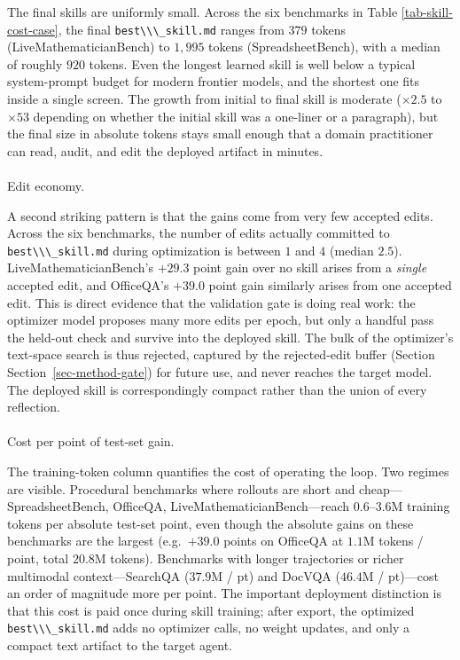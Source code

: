\documentclass[
]{article}
\makeatletter
\let\oldparagraph\paragraph
\renewcommand{\paragraph}{
    \@ifstar
      \xxxParagraphStar
      \xxxParagraphNoStar
  }
\newcommand{\xxxParagraphStar}[1]{\oldparagraph*{#1}\mbox{}}
\newcommand{\xxxParagraphNoStar}[1]{\oldparagraph{#1}\mbox{}}
\newcommand{\passthrough}[1]{#1}
\makeatother
\begin{document}
The final skills are uniformly small. Across the six benchmarks in Table
\ref{tab-skill-cost-case}, the final
\passthrough{\lstinline!best\\\_skill.md!} ranges from \(379\) tokens
(LiveMathematicianBench) to \(1{,}995\) tokens (SpreadsheetBench), with
a median of roughly \(920\) tokens. Even the longest learned skill is
well below a typical system-prompt budget for modern frontier models,
and the shortest one fits inside a single screen. The growth from
initial to final skill is moderate (\(\times 2.5\) to \(\times 53\)
depending on whether the initial skill was a one-liner or a paragraph),
but the final size in absolute tokens stays small enough that a domain
practitioner can read, audit, and edit the deployed artifact in minutes.

\paragraph{Edit economy.}\label{edit-economy.}

A second striking pattern is that the gains come from very few accepted
edits. Across the six benchmarks, the number of edits actually committed
to \passthrough{\lstinline!best\\\_skill.md!} during optimization is
between \(1\) and \(4\) (median \(2.5\)). LiveMathematicianBench's
\(+29.3\) point gain over no skill arises from a \emph{single} accepted
edit, and OfficeQA's \(+39.0\) point gain similarly arises from one
accepted edit. This is direct evidence that the validation gate is doing
real work: the optimizer model proposes many more edits per epoch, but
only a handful pass the held-out check and survive into the deployed
skill. The bulk of the optimizer's text-space search is thus rejected,
captured by the rejected-edit buffer (Section
Section~\ref{sec-method-gate}) for future use, and never reaches the
target model. The deployed skill is correspondingly compact rather than
the union of every reflection.

\paragraph{Cost per point of test-set
gain.}\label{cost-per-point-of-test-set-gain.}

The training-token column quantifies the cost of operating the loop. Two
regimes are visible. Procedural benchmarks where rollouts are short and
cheap---SpreadsheetBench, OfficeQA, LiveMathematicianBench---reach
\(0.6\)--\(3.6\)M training tokens per absolute test-set point, even
though the absolute gains on these benchmarks are the largest
(e.g.~\(+39.0\) points on OfficeQA at \(1.1\)M tokens / point, total
\(20.8\)M tokens). Benchmarks with longer trajectories or richer
multimodal context---SearchQA (\(37.9\)M / pt) and DocVQA (\(46.4\)M /
pt)---cost an order of magnitude more per point. The important
deployment distinction is that this cost is paid once during skill
training; after export, the optimized
\passthrough{\lstinline!best\\\_skill.md!} adds no optimizer calls, no
weight updates, and only a compact text artifact to the target agent.
\end{document}
